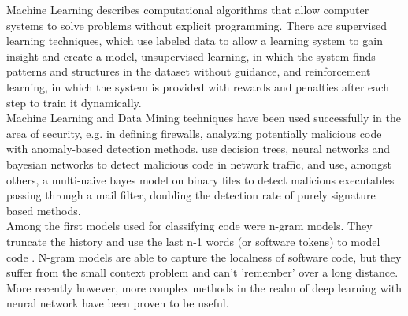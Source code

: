 \documentclass[
	a4paper,
	pagesize,
	pdftex,
	12pt,
	twoside, %
	BCOR=5mm, %
	ngerman,
	fleqn,
	final,
	]{scrartcl}
\begin{document}
Machine Learning describes computational algorithms that allow computer systems to solve problems without explicit programming. There are supervised learning techniques, which use labeled data to allow a learning system to gain insight and create a model, unsupervised learning, in which the system finds patterns and structures in the dataset without guidance, and reinforcement learning, in which the system is provided with rewards and penalties after each step to train it dynamically.\\

Machine Learning and Data Mining techniques have been used successfully in the area of security, e.g. in defining firewalls, analyzing potentially malicious code with anomaly-based detection methods. \cite{Elovici.2007} use decision trees, neural networks and bayesian networks to detect malicious code in network traffic, and \cite{Schultz.2000} use, amongst others, a multi-naive bayes model on binary files to detect malicious executables passing through a mail filter, doubling the detection rate of purely signature based methods.\\

Among the first models used for classifying code were n-gram models. They truncate the history and use the last n-1 words (or software tokens) to model code \cite{Nguyen.2013,Pang.2015}. N-gram models are able to capture the localness of software code, but they suffer from the small context problem and can't 'remember' over a long distance. More recently however, more complex methods in the realm of deep learning with neural network have been proven to be useful.\\
\end{document}
